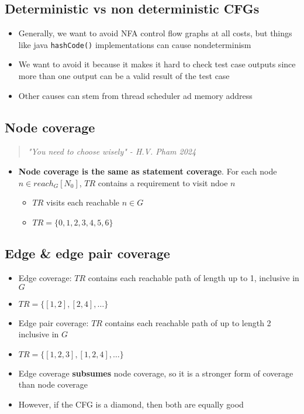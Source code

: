 \documentclass[12pt]{book}
\begin{document}
\subsection{Deterministic vs non deterministic CFGs}

\begin{itemize}
  \item Generally, we want to avoid NFA control flow graphs at all costs, but things like java \texttt{hashCode()} implementations can cause nondeterminism
  \item We want to avoid it because it makes it hard to check test case outputs since more than one output can be a valid result of the test case
  \item Other causes can stem from thread scheduler ad memory address
\end{itemize}

\subsection{Node coverage}

\begin{quote}
  \textit{"You need to choose wisely" - H.V. Pham 2024}
\end{quote}
\begin{itemize}
  \item \textbf{Node coverage is the same as statement coverage}. For each node $n\in reach_G\left[N_0\right]$, $TR$ contains a requirement to visit ndoe $n$
  \begin{itemize}
    \item $TR$ visits each reachable $n\in G$
    \item $TR=\{0,1,2,3,4,5,6\}$
  \end{itemize} 
\end{itemize}

\subsection{Edge \& edge pair coverage}

\begin{itemize}
  \item Edge coverage: $TR$ contains each reachable path of length up to 1, inclusive in $G$
  \item $TR=\{[1,2],[2,4],\ldots\}$
  \item Edge pair coverage: $TR$ contains each reachable path of up to length 2 inclusive in $G$
  \item $TR=\{[1,2,3],[1,2,4],\ldots\}$
  \item Edge coverage \textbf{subsumes} node coverage, so it is a stronger form of coverage than node coverage
  \item However, if the CFG is a diamond, then both are equally good
\end{itemize}
\end{document}
